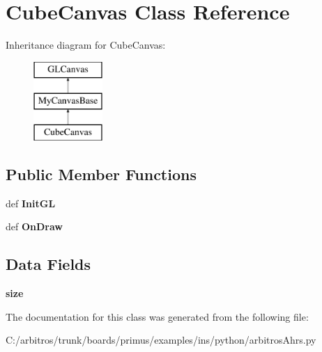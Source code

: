 \hypertarget{classarbitros_ahrs_1_1_cube_canvas}{\section{Cube\-Canvas Class Reference}
\label{classarbitros_ahrs_1_1_cube_canvas}
}
Inheritance diagram for Cube\-Canvas\-:\begin{figure}[H]
\begin{center}
\leavevmode
\includegraphics[height=3.000000cm]{classarbitros_ahrs_1_1_cube_canvas}
\end{center}
\end{figure}
\subsection*{Public Member Functions}
\begin{DoxyCompactItemize}
\item 
\hypertarget{classarbitros_ahrs_1_1_cube_canvas_aa5d4da6894799e330c531fcff2320723}{def {\bfseries Init\-G\-L}}\label{classarbitros_ahrs_1_1_cube_canvas_aa5d4da6894799e330c531fcff2320723}

\item 
\hypertarget{classarbitros_ahrs_1_1_cube_canvas_a06264628fa709c57ac53fe3f63080317}{def {\bfseries On\-Draw}}\label{classarbitros_ahrs_1_1_cube_canvas_a06264628fa709c57ac53fe3f63080317}

\end{DoxyCompactItemize}
\subsection*{Data Fields}
\begin{DoxyCompactItemize}
\item 
\hypertarget{classarbitros_ahrs_1_1_cube_canvas_aa3d6656320f1a7278c0c2c7fdf07617c}{{\bfseries size}}\label{classarbitros_ahrs_1_1_cube_canvas_aa3d6656320f1a7278c0c2c7fdf07617c}

\end{DoxyCompactItemize}


The documentation for this class was generated from the following file\-:\begin{DoxyCompactItemize}
\item 
C\-:/arbitros/trunk/boards/primus/examples/ins/python/arbitros\-Ahrs.\-py\end{DoxyCompactItemize}
